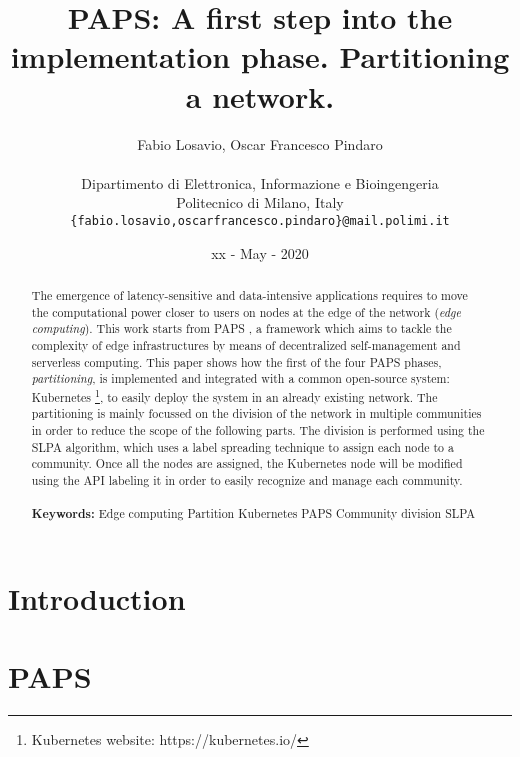 \documentclass{article} %
\title{\textbf{\huge{PAPS: A first step into the implementation phase. Partitioning a network.}}}
\author{\color{black}Fabio Losavio, Oscar Francesco Pindaro \\ \\
        Dipartimento di Elettronica, Informazione e Bioingengeria \\
        Politecnico di Milano, Italy \\
        \texttt{\{fabio.losavio,oscarfrancesco.pindaro\}@mail.polimi.it}}
\date{xx - May - 2020}
\begin{document}
\maketitle

\begin{abstract}
    The emergence of latency-sensitive and data-intensive applications requires to move the 
    computational power closer to users on nodes at the edge of the network (\textit{edge computing}).
    This work starts from PAPS \cite{PAPS}, a framework which aims to tackle the complexity of edge 
    infrastructures by means of decentralized self-management and serverless computing. This paper
    shows how the first of the four PAPS phases, \textit{partitioning}, is implemented and integrated
    with a common open-source system: Kubernetes \footnote{Kubernetes website: https://kubernetes.io/},
    to easily deploy the system in an already
    existing network. The partitioning is mainly focussed on the division of the network in multiple 
    communities in order to reduce the scope of the following parts. The division is performed using 
    the SLPA \cite{SLPA} algorithm, which uses a label spreading technique to assign each node to a
    community. Once all the nodes are assigned, the Kubernetes node will be modified using the API 
    labeling it in order to easily recognize and manage each community.
    \\ \\
    \textbf{Keywords:} Edge computing \textbf{\textperiodcentered} Partition 
    \textbf{\textperiodcentered} Kubernetes \textbf{\textperiodcentered} PAPS
    \textbf{\textperiodcentered} Community division \textbf{\textperiodcentered} SLPA
    
\end{abstract}
{{\section{Introduction}\label{sect:intro}}}




{{\section{PAPS}\label{sect:paps}}}

\end{document}
